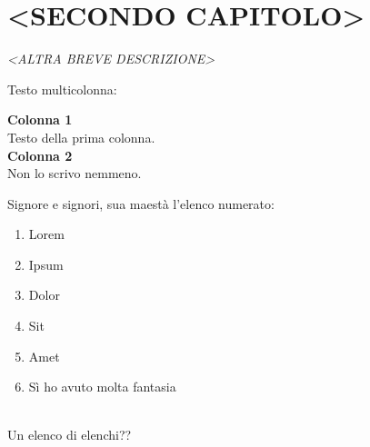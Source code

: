 \documentclass[envcountsame,envcountchap]{svmono}
\begin{document}
\chapter{<SECONDO CAPITOLO>} \label{Cap.2}

\vspace{2cm}

\begin{flushright}
\textit{<ALTRA BREVE DESCRIZIONE>}
\end{flushright}

\vspace{0.5cm}

Testo multicolonna: 

\begin{multicols}{2}
    \textbf{Colonna 1}\\
    Testo della prima colonna.
\columnbreak\\
    \textbf{Colonna 2}\\
    Non lo scrivo nemmeno.
\end{multicols}






Signore e signori, sua maestà l'elenco numerato:
\begin{enumerate}
    \item Lorem
    \item Ipsum
    \item Dolor
    \item Sit
    \item Amet
    \item Sì ho avuto molta fantasia
\end{enumerate} 

~\\

Un elenco di elenchi??
\end{document}
